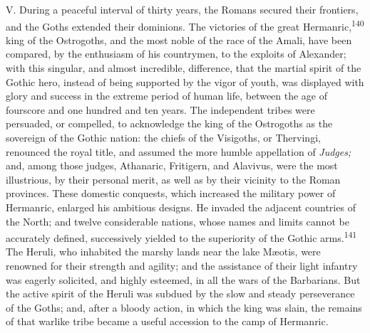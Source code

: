 
V. During a peaceful interval of thirty years, the Romans secured
their frontiers, and the Goths extended their dominions. The
victories of the great Hermanric,\textsuperscript{140} king of the Ostrogoths, and
the most noble of the race of the Amali, have been compared, by
the enthusiasm of his countrymen, to the exploits of Alexander;
with this singular, and almost incredible, difference, that the
martial spirit of the Gothic hero, instead of being supported by
the vigor of youth, was displayed with glory and success in the
extreme period of human life, between the age of fourscore and
one hundred and ten years. The independent tribes were persuaded,
or compelled, to acknowledge the king of the Ostrogoths as the
sovereign of the Gothic nation: the chiefs of the Visigoths, or
Thervingi, renounced the royal title, and assumed the more humble
appellation of \textit{Judges;} and, among those judges, Athanaric,
Fritigern, and Alavivus, were the most illustrious, by their
personal merit, as well as by their vicinity to the Roman
provinces. These domestic conquests, which increased the military
power of Hermanric, enlarged his ambitious designs. He invaded
the adjacent countries of the North; and twelve considerable
nations, whose names and limits cannot be accurately defined,
successively yielded to the superiority of the Gothic arms.\textsuperscript{141}
The Heruli, who inhabited the marshy lands near the lake Mæotis,
were renowned for their strength and agility; and the assistance
of their light infantry was eagerly solicited, and highly
esteemed, in all the wars of the Barbarians. But the active
spirit of the Heruli was subdued by the slow and steady
perseverance of the Goths; and, after a bloody action, in which
the king was slain, the remains of that warlike tribe became a
useful accession to the camp of Hermanric.

